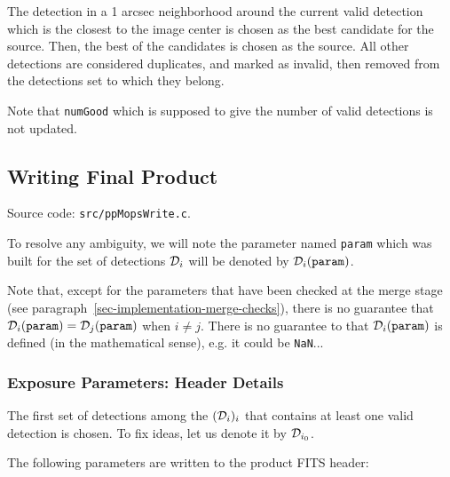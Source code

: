 \documentclass[panstarrs,spec]{panstarrs}
\begin{document}
The detection in a 1 arcsec neighborhood around the current valid
detection which is the closest to the image center is chosen as the
best candidate for the source. Then, the best of the candidates is
chosen as the source. All other detections are considered duplicates,
and marked as invalid, then removed from the detections set to which
they belong.

Note that \texttt{numGood} which is supposed to give the number of
valid detections is not updated.

\subsection{Writing Final Product}
\label{sec-implementation-write}

Source code: \texttt{src/ppMopsWrite.c}.

To resolve any ambiguity, we will note the parameter named
\texttt{param} which was built for the set of detections ${\cal
  D}_{i}$ will be denoted by ${\cal D}_{i}(\mathtt{param})$. 

Note that, except for the parameters that have been checked at the
merge stage (see paragraph~\ref{sec-implementation-merge-checks}),
there is no guarantee that ${\cal D}_{i}(\mathtt{param}) = {\cal
  D}_{j}(\mathtt{param})$ when $i \neq j$. There is no guarantee to
that ${\cal D}_{i}(\mathtt{param})$ is defined (in the mathematical
sense), e.g. it could be \texttt{NaN}...

\subsubsection{Exposure Parameters: Header Details}
\label{sec-implementation-write-header}

The first set of detections among the $({\cal D}_{i})_i$ that contains
at least one valid detection is chosen. To fix ideas, let us denote
it by ${\cal D}_{i_0}$. 

The following parameters are written to the product FITS header:
\end{document}

